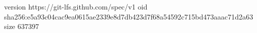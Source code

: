 version https://git-lfs.github.com/spec/v1
oid sha256:e5a93c04cac9ea0615ae2339e8d7db423d7f68a54592c715bd473aaac71d2a63
size 637397
